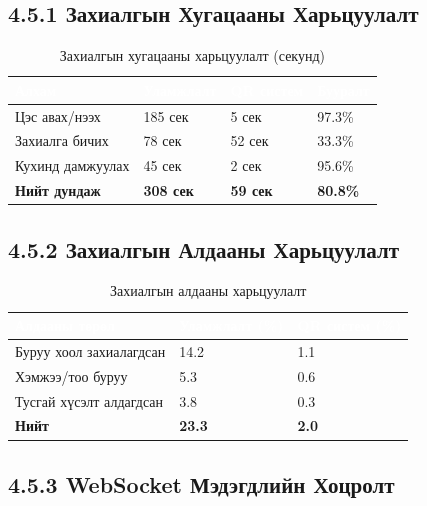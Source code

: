 \subsection{4.5.1 Захиалгын Хугацааны Харьцуулалт}

\begin{table}[htbp]
\caption{Захиалгын хугацааны харьцуулалт (секунд)}
\label{tab:time}
\centering
\begin{tabularx}{\textwidth}{|X|Z|Z|Z|}
\hline
{}\textcolor{white}{\textbf{Алхам}}
  & \textcolor{white}{\textbf{Уламжлалт}}
  & \textcolor{white}{\textbf{QR систем}}
  & \textcolor{white}{\textbf{Бууралт}} \\ \hline
Цэс авах/нээх           & 185 сек & 5 сек  & 97.3\% \\ \hline
Захиалга бичих           & 78 сек  & 52 сек & 33.3\% \\ \hline
Кухинд дамжуулах         & 45 сек  & 2 сек  & 95.6\% \\ \hline
{}\textbf{Нийт дундаж} & \textbf{308 сек} & \textbf{59 сек} & \textbf{80.8\%} \\ \hline
\end{tabularx}
\end{table}

\subsection{4.5.2 Захиалгын Алдааны Харьцуулалт}

\begin{table}[htbp]
\caption{Захиалгын алдааны харьцуулалт}
\label{tab:error}
\centering
\begin{tabularx}{0.85\textwidth}{|X|Z|Z|}
\hline
{}\textcolor{white}{\textbf{Алдааны төрөл}}
  & \textcolor{white}{\textbf{Уламжлалт (\%)}}
  & \textcolor{white}{\textbf{QR систем (\%)}} \\ \hline
Буруу хоол захиалагдсан   & 14.2 & 1.1 \\ \hline
Хэмжээ/тоо буруу           & 5.3  & 0.6 \\ \hline
Тусгай хүсэлт алдагдсан   & 3.8  & 0.3 \\ \hline
{}\textbf{Нийт}           & \textbf{23.3} & \textbf{2.0} \\ \hline
\end{tabularx}
\end{table}

\subsection{4.5.3 WebSocket Мэдэгдлийн Хоцролт}


